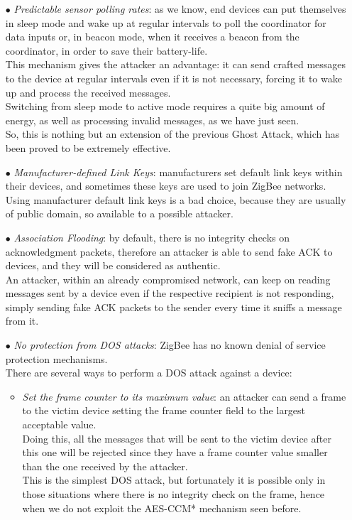 \documentclass[12pt]{report}
\begin{document}
{\begin{itemize}
\item[$\bullet$] \emph{Predictable sensor polling rates}: as we know, end devices can put themselves in sleep mode and wake up at regular intervals to poll the coordinator for data inputs or, in beacon mode, when it receives a beacon from the coordinator, in order to save their battery-life.\\
This mechanism gives the attacker an advantage: it can send crafted messages to the device at regular intervals even if it is not necessary, forcing it to wake up and process the received messages.\\
Switching from sleep mode to active mode requires a quite big amount of energy, as well as processing invalid messages, as we have just seen.\\
So, this is nothing but an extension of the previous Ghost Attack, which has been proved to be extremely effective.

\item[$\bullet$] \emph{Manufacturer-defined Link Keys}: manufacturers set default link keys within their devices, and sometimes these keys are used to join ZigBee networks.\\
Using manufacturer default link keys is a bad choice, because they are usually of public domain, so available to a possible attacker.

\item[$\bullet$] \emph{Association Flooding}: by default, there is no integrity checks on acknowledgment packets, therefore an attacker is able to send fake ACK to devices, and they will be considered as authentic.\\
An attacker, within an already compromised network, can keep on reading messages sent by a device even if the respective recipient is not responding, simply sending fake ACK packets to the sender every time it sniffs a message from it. 

\item[$\bullet$] \emph{No protection from DOS attacks}: ZigBee has no known denial of service protection mechanisms.\\
There are several ways to perform a DOS attack against a device:


\begin{itemize}
\setlength{\itemindent}{+4mm}
\item \emph{Set the frame counter to its maximum value}: an attacker can send a frame to the victim device setting the frame counter field to the largest acceptable value.\\
Doing this, all the messages that will be sent to the victim device after this one will be rejected since they have a frame counter value smaller than the one received by the attacker.\\
This is the simplest DOS attack, but fortunately it is possible only in those situations where there is no integrity check on the frame, hence when we do not exploit the AES-CCM* mechanism seen before.\\


\end{itemize}
\end{itemize}}
\end{document}
